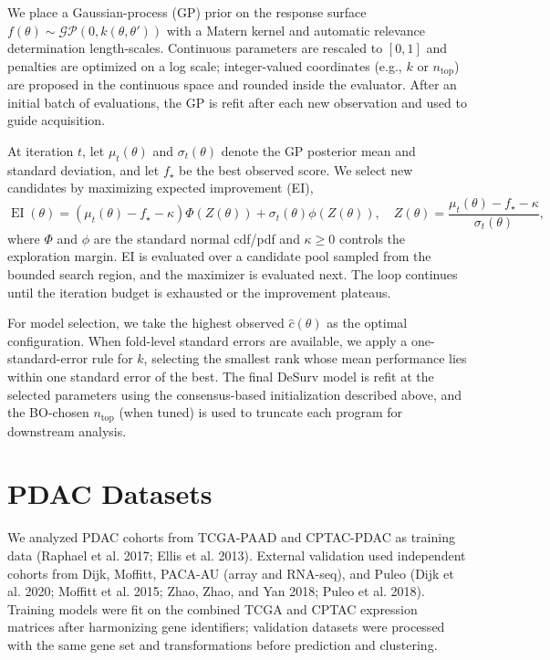 \documentclass[
]{article}
\begin{document}
We place a Gaussian-process (GP) prior on the response surface
\(f(\theta) \sim \mathcal{GP}(0, k(\theta,\theta'))\) with a Matern
kernel and automatic relevance determination length-scales. Continuous
parameters are rescaled to \([0,1]\) and penalties are optimized on a
log scale; integer-valued coordinates (e.g., \(k\) or
\(n_{\text{top}}\)) are proposed in the continuous space and rounded
inside the evaluator. After an initial batch of evaluations, the GP is
refit after each new observation and used to guide acquisition.

At iteration \(t\), let \(\mu_t(\theta)\) and \(\sigma_t(\theta)\)
denote the GP posterior mean and standard deviation, and let \(f_\star\)
be the best observed score. We select new candidates by maximizing
expected improvement (EI), \[
\operatorname{EI}(\theta) =
\left(\mu_t(\theta) - f_\star - \kappa\right)\Phi(Z(\theta))
  + \sigma_t(\theta)\phi(Z(\theta)),
\quad
Z(\theta) = \frac{\mu_t(\theta) - f_\star - \kappa}{\sigma_t(\theta)},
\] where \(\Phi\) and \(\phi\) are the standard normal cdf/pdf and
\(\kappa \ge 0\) controls the exploration margin. EI is evaluated over a
candidate pool sampled from the bounded search region, and the maximizer
is evaluated next. The loop continues until the iteration budget is
exhausted or the improvement plateaus.

For model selection, we take the highest observed \(\hat{c}(\theta)\) as
the optimal configuration. When fold-level standard errors are
available, we apply a one-standard-error rule for \(k\), selecting the
smallest rank whose mean performance lies within one standard error of
the best. The final DeSurv model is refit at the selected parameters
using the consensus-based initialization described above, and the
BO-chosen \(n_{\text{top}}\) (when tuned) is used to truncate each
program for downstream analysis.

\section{PDAC Datasets}

We analyzed PDAC cohorts from TCGA-PAAD and CPTAC-PDAC as training data
(Raphael et al. 2017; Ellis et al. 2013). External validation used
independent cohorts from Dijk, Moffitt, PACA-AU (array and RNA-seq), and
Puleo (Dijk et al. 2020; Moffitt et al. 2015; Zhao, Zhao, and Yan 2018;
Puleo et al. 2018). Training models were fit on the combined TCGA and
CPTAC expression matrices after harmonizing gene identifiers; validation
datasets were processed with the same gene set and transformations
before prediction and clustering.
\end{document}
